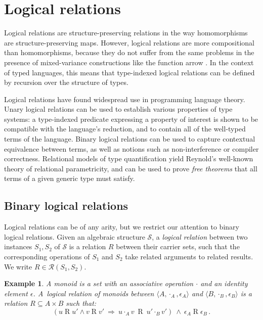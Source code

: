 \documentclass[11pt,oneside,draft]{book}
\newtheorem{example}[theorem]{Example}
\theoremstyle{definition}
\begin{document}


\section{Logical relations} \label{sec:lr} %

Logical relations are structure-preserving relations
in the way homomorphisms are structure-preserving maps.
However,
logical relations are more compositional than homomorphisms,
because they do not suffer from the same problems
in the presence of mixed-variance constructions
like the function arrow %
\citep{lrp}.
In the context of typed languages,
this means that type-indexed logical relations
can be defined by recursion over the structure of types.

Logical relations have found widespread use in programming language theory.
Unary logical relations can be used to establish
various properties of type systems:
a type-indexed predicate expressing a property of interest
is shown to be compatible with the language's reduction,
and to contain all of the well-typed terms of the language.
Binary logical relations can be used to capture
contextual equivalence between terms,
as well as notions such as non-interference or compiler correctness.
Relational models of type quantification yield
Reynold's well-known theory of relational parametricity,
and can be used to prove \emph{free theorems} that
all terms of a given generic type must satisfy.

\subsection{Binary logical relations}

Logical relations can be of any arity,
but
we restrict our attention to
binary logical relations.
Given an algebraic structure $\mathcal{S}$,
a \emph{logical relation}
between two instances $S_1, S_2$ of $\mathcal{S}$
is a relation $R$
between their carrier sets,
such that the corresponding operations of $S_1$ and $S_2$
take related arguments to related results.
We write $R \in \mathcal{R}(S_1, S_2)$.

\begin{example}%
\label{ex:monoid}
A monoid is a set with
an associative operation $\cdot$ and
an identity element $\epsilon$.
A~\emph{logical relation of monoids} between
$\langle A, \cdot_A, \epsilon_A \rangle$ and
$\langle B, \cdot_B, \epsilon_B \rangle$
is a relation $R \subseteq A \times B$
such that:
\begin{equation}
\label{eqn:monoidrel}
(u \mathrel{R} u' \wedge v \mathrel{R} v' \: \Rightarrow \:
 u \cdot_A v \: \mathrel{R} \: u' \cdot_B v')
\: \wedge \:
\epsilon_A \mathrel{R} \epsilon_B \,.
\end{equation}
\end{example}
\end{document}
